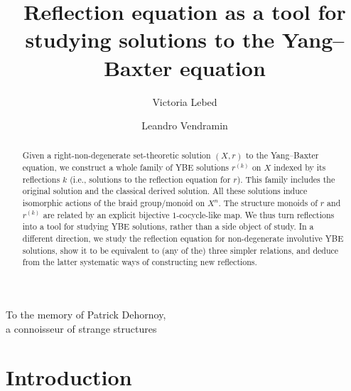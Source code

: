 \documentclass{amsart}
\newenvironment{dedication}
  {%
   \vspace*{.3cm}%
   \itshape             %
   \raggedleft          %
  }
  {\par %
   \vspace*{.3cm} %
  }
\theoremstyle{plain}
\theoremstyle{definition}
\theoremstyle{remark}
\begin{document}
\title[]{Reflection equation as a tool for studying solutions to the Yang--Baxter equation}%

\begin{abstract}
Given a right-non-degenerate set-theoretic solution $(X,r)$ to the Yang--Baxter equation, we construct a whole family of YBE solutions $r^{(k)}$ on $X$ indexed by  its reflections $k$ (i.e., solutions to the reflection equation for $r$). This family includes the original solution and the classical derived solution. All these solutions induce isomorphic actions of the braid group/monoid on $X^n$. The structure monoids %
of $r$ and $r^{(k)}$ are related by an explicit bijective $1$-cocycle-like map. We thus turn reflections into a tool for studying YBE solutions, rather than a side object of study. In a different direction, we study the reflection equation for non-degenerate involutive YBE solutions, show it to be equivalent to (any of the) three simpler relations, and deduce from the latter systematic ways of constructing new reflections.
\end{abstract}




\author{Victoria Lebed}
\address{ LMNO, Universit\'e de Caen--Normandie, BP 5186, 14032 Caen Cedex, France}
  
\author{Leandro Vendramin}
\address{Departamento de Matem\'atica -- FCEN,
Universidad de Buenos Aires, Pab. I -- Ciudad Universitaria (1428),
Buenos Aires, Argentina}

\maketitle

\begin{dedication}
To the memory of Patrick Dehornoy,\\ a connoisseur of strange structures  
\end{dedication} 

\section*{Introduction}
\end{document}
